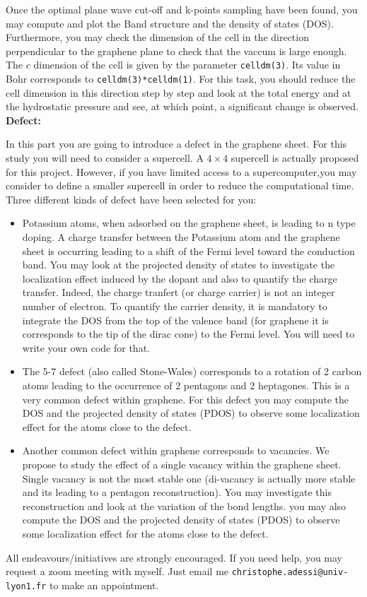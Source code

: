 \documentclass[11pt]{article}
\begin{document}
Once the optimal plane wave cut-off and k-points sampling have been
found, you may compute and plot the Band structure and the density of
states (DOS). Furthermore, you may check the dimension of the cell in
the direction perpendicular to the graphene plane to check that the
vaccum is large enough. The $c$ dimension of the cell is given by the
parameter {\texttt{celldm(3)}}. Its value in Bohr corresponds to
{\texttt{celldm(3)*celldm(1)}}. For this task, you should reduce the
cell dimension in this direction step by step and look at the total
energy and at the hydrostatic pressure and see, at which point, a
significant change is observed.\\


{\bf{Defect:}}

In this part you are going to introduce a defect in the graphene
sheet.  For this study you will need to consider a supercell. A
$4\times 4$ supercell is actually proposed for this project.  However,
if you have limited access to a supercomputer,you may consider to
define a smaller supercell in order to reduce the computational
time. Three different kinds of defect have been selected for you:

\begin{itemize}
\item
  Potassium atoms, when adsorbed on the graphene sheet, is leading to
  n type doping. A charge transfer between the Potassium atom and the
  graphene sheet is occurring leading to a shift of the Fermi level
  toward the conduction band. You may look at the projected density of
  states to investigate the localization effect induced by the dopant
  and also to quantify the charge transfer. Indeed, the charge
  tranfert (or charge carrier) is not an integer number of
  electron. To quantify the carrier density, it is mandatory to
  integrate the DOS from the top of the valence band (for graphene it
  is corresponds to the tip of the dirac cone) to the Fermi level. You
  will need to write your own code for that.\\

  
\item
  The 5-7 defect (also called Stone-Wales) corresponds to a rotation
  of 2 carbon atoms leading to the occurrence of 2 pentagons and 2
  heptagones. This is a very common defect within graphene. For this
  defect you may compute the DOS and the projected density of states
  (PDOS) to observe some localization effect for the atoms close to
  the defect.
  
\item
  Another common defect within graphene corresponds to vacancies. We
  propose to study the effect of a single vacancy within the graphene
  sheet. Single vacancy is not the most stable one (di-vacancy is
  actually more stable and its leading to a pentagon
  reconstruction). You may investigate this reconstruction and look at
  the variation of the bond lengths. you may also compute the DOS and
  the projected density of states (PDOS) to observe some localization
  effect for the atoms close to the defect.


  \vspace{5pt}

\end{itemize}


All endeavours/initiatives are strongly encouraged. If you need help,
you may request a zoom meeting with myself. Just email me
{\texttt{christophe.adessi@univ-lyon1.fr}} to make an appointment.
\end{document}
